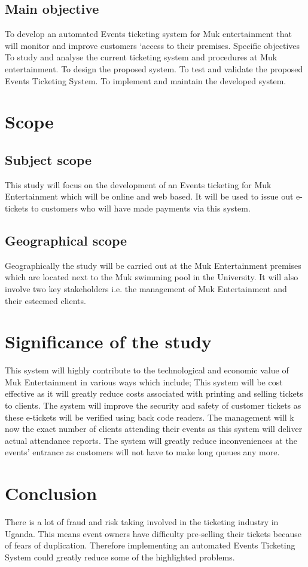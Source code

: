 \documentclass[10pt,a4paper]{report}
\begin{document}
\subsection{Main objective}
To develop an automated Events ticketing system for Muk entertainment that will monitor and improve customers ‘access to their premises.
Specific objectives
To study and analyse the current ticketing system and procedures at Muk entertainment.
To design the proposed system.
To test and validate the proposed Events Ticketing System.
To implement and maintain the developed system.
\section{Scope}
\subsection{Subject scope}
This study will focus on the development of an Events ticketing for Muk Entertainment which will be online and web based. It will be used to issue out e-tickets to customers who will have made payments via this system.
\subsection{Geographical scope} 
Geographically the study will be carried out at the Muk Entertainment premises which are located next to the Muk swimming pool in the University. It will also involve two key stakeholders i.e. the management of Muk Entertainment and their esteemed clients.
\section{Significance of the study}
This system will highly contribute to the technological and economic value of Muk Entertainment in various ways which include;
This system will be cost effective as it will greatly reduce costs associated with printing and selling tickets to clients.
The system will improve the security and safety of customer tickets as these e-tickets will be verified using back code readers.
The management will k now the exact number of clients attending their events as this system will deliver actual attendance reports.
The system will greatly reduce inconveniences at the events’ entrance as customers will not have to make long queues any more.

\section{Conclusion}
There is a lot of fraud and risk taking involved in the ticketing industry in Uganda. This means event owners have difficulty pre-selling their tickets because of fears of duplication. Therefore implementing an automated Events Ticketing System could greatly reduce some of the highlighted problems.
\end{document}
